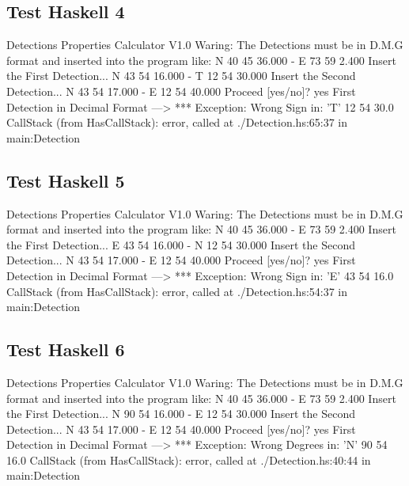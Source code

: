 \documentclass{article}
\begin{document}
\subsection*{Test Haskell 4}
	\begin{spverbatim}
		Detections Properties Calculator V1.0 
		Waring: The Detections must be in D.M.G format and inserted into the program like: N 40 45 36.000 - E 73 59 2.400
		Insert the First Detection...
		N 43 54 16.000 - T 12 54 30.000
		Insert the Second Detection...
		N 43 54 17.000 - E 12 54 40.000
		Proceed [yes/no]?
		yes
		First Detection in Decimal Format ---> *** Exception: Wrong Sign in:  'T' 12 54 30.0
		CallStack (from HasCallStack):
		error, called at ./Detection.hs:65:37 in main:Detection
	\end{spverbatim}

\subsection*{Test Haskell 5}
	\begin{spverbatim}
		Detections Properties Calculator V1.0 
		Waring: The Detections must be in D.M.G format and inserted into the program like: N 40 45 36.000 - E 73 59 2.400
		Insert the First Detection...
		E 43 54 16.000 - N 12 54 30.000
		Insert the Second Detection...
		N 43 54 17.000 - E 12 54 40.000
		Proceed [yes/no]?
		yes
		First Detection in Decimal Format ---> *** Exception: Wrong Sign in:  'E' 43 54 16.0
		CallStack (from HasCallStack):
		error, called at ./Detection.hs:54:37 in main:Detection
	\end{spverbatim}

\subsection*{Test Haskell 6}
	\begin{spverbatim}
		Detections Properties Calculator V1.0 
		Waring: The Detections must be in D.M.G format and inserted into the program like: N 40 45 36.000 - E 73 59 2.400
		Insert the First Detection...
		N 90 54 16.000 - E 12 54 30.000
		Insert the Second Detection...
		N 43 54 17.000 - E 12 54 40.000
		Proceed [yes/no]?
		yes
		First Detection in Decimal Format ---> *** Exception: Wrong Degrees in:  'N' 90 54 16.0
		CallStack (from HasCallStack):
		error, called at ./Detection.hs:40:44 in main:Detection
	\end{spverbatim}
\end{document}
